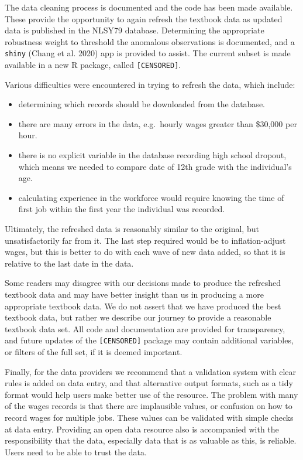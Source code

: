 \documentclass{article}
\providecommand{\tightlist}{%
  \setlength{\itemsep}{0pt}\setlength{\parskip}{0pt}}
\begin{document}
The data cleaning process is documented and the code has been made available. These provide the opportunity to again refresh the textbook data as updated data is published in the NLSY79 database.
Determining the appropriate robustness weight to threshold the anomalous observations is documented, and a \texttt{shiny} (Chang et al. 2020) app is provided to assist.
The current subset is made available in a new R package, called \texttt{[CENSORED]}.

Various difficulties were encountered in trying to refresh the data, which include:

\begin{itemize}
\tightlist
\item
  determining which records should be downloaded from the database.
\item
  there are many errors in the data, e.g.~hourly wages greater than \$30,000 per hour.
\item
  there is no explicit variable in the database recording high school dropout, which means we needed to compare date of 12th grade with the individual's age.
\item
  calculating experience in the workforce would require knowing the time of first job within the first year the individual was recorded.
\end{itemize}

Ultimately, the refreshed data is reasonably similar to the original, but unsatisfactorily far from it. The last step required would be to inflation-adjust wages, but this is better to do with each wave of new data added, so that it is relative to the last date in the data.

Some readers may disagree with our decisions made to produce the refreshed textbook data and may have better insight than us in producing a more appropriate textbook data. We do not assert that we have produced the best textbook data, but rather we describe our journey to provide a reasonable textbook data set. All code and documentation are provided for transparency, and future updates of the \texttt{[CENSORED]} package may contain additional variables, or filters of the full set, if it is deemed important.

Finally, for the data providers we recommend that a validation system with clear rules is added on data entry, and that alternative output formats, such as a tidy format would help users make better use of the resource. The problem with many of the wages records is that there are implausible values, or confusion on how to record wages for multiple jobs. These values can be validated with simple checks at data entry. Providing an open data resource also is accompanied with the responsibility that the data, especially data that is as valuable as this, is reliable. Users need to be able to trust the data.
\end{document}
